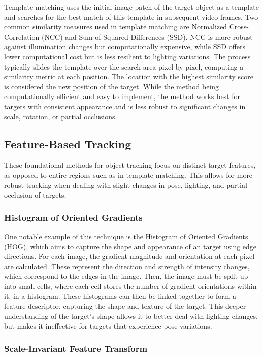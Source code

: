 \documentclass{article}
\begin{document}
Template matching uses the initial image patch of the target object as a template and searches for the best match of this template in subsequent video frames. Two common similarity measures used in template matching are Normalized Cross-Correlation (NCC) and Sum of Squared Differences (SSD). NCC is more robust against illumination changes but computationally expensive, while SSD offers lower computational cost but is less resilient to lighting variations. The process typically slides the template over the search area pixel by pixel, computing a similarity metric at each position. The location with the highest similarity score is considered the new position of the target. While the method being computationally efficient and easy to implement, the method works best for targets with consistent appearance and is less robust to significant changes in scale, rotation, or partial occlusions. 

\subsection{Feature-Based Tracking}

These foundational methods for object tracking focus on distinct target features, as opposed to entire regions such as in template matching. This allows for more robust tracking when dealing with slight changes in pose, lighting, and partial occlusion of targets.

\subsubsection{Histogram of Oriented Gradients}

One notable example of this technique is the Histogram of Oriented Gradients (HOG), which aims to capture the shape and appearance of an target using edge directions. For each image, the gradient magnitude and orientation at each pixel are calculated. These represent the direction and strength of intensity changes, which correspond to the edges in the image. Then, the image must be split up into small cells, where each cell stores the number of gradient orientations within it, in a histogram. These histograms can then be linked together to form a feature descriptor, capturing the shape and texture of the target. This deeper understanding of the target's shape allows it to better deal with lighting changes, but makes it ineffective for targets that experience pose variations.


\subsubsection{Scale-Invariant Feature Transform}
\end{document}
